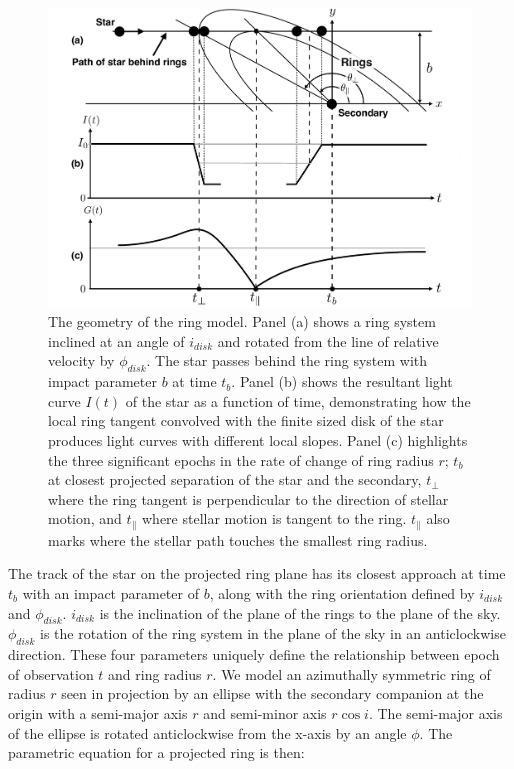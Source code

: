 \documentclass{emulateapj}
\newcommand{\tb}{t_\bot}
\newcommand{\tp}{t_\parallel}
\newcommand{\id}{i_{disk}}
\newcommand{\pd}{\phi_{disk}}
\begin{document}
\begin{figure}
\centering
\includegraphics[width=\hsize]{fig1}

\caption{The geometry of the ring model. Panel (a) shows a ring system
  inclined at an angle of $\id$ and rotated from the line of relative
  velocity by $\pd$.
The star passes behind the ring system with impact parameter $b$ at
time $t_b$. Panel (b) shows the resultant light curve $I(t)$ of the
star as a function of time, demonstrating how the local ring tangent
convolved with the finite sized disk of the star produces light curves
with different local slopes.
Panel (c) highlights the three significant epochs in the rate of
change of ring radius $r$; $t_b$ at closest projected separation of
the star and the secondary, $\tb$ where the ring tangent is
perpendicular to the direction of stellar motion, and $\tp$ where
stellar motion is tangent to the ring.
$\tp$ also marks where the stellar path touches the smallest ring
radius.\label{fig:ringgeom}}
\end{figure}


The track of the star on the projected ring plane has its closest
approach at time $t_b$ with an impact parameter of $b$, along with the
ring orientation defined by $\id$ and $\pd$.
$\id$ is the inclination of the plane of the rings to the plane of the
sky.
$\pd$ is the rotation of the ring system in the plane of the sky in an
anticlockwise direction.
These four parameters uniquely define the relationship between epoch
of observation $t$ and ring radius $r$.
We model an azimuthally symmetric ring of radius $r$ seen in
projection by an ellipse with the secondary companion at the origin
with a semi-major axis $r$ and semi-minor axis $r \cos i$.
The semi-major axis of the ellipse is rotated anticlockwise from the
x-axis by an angle $\phi$.
The parametric equation for a projected ring is then:
\end{document}
